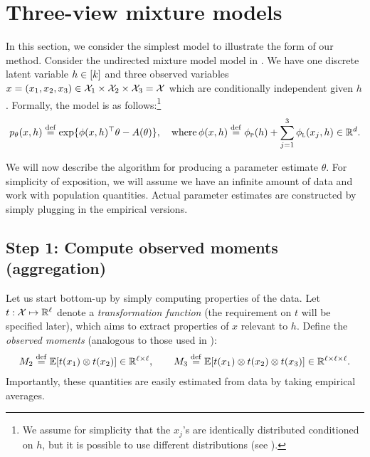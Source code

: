 \section{Three-view mixture models}
\label{sec:threeViewMixtureModel}


In this section, we consider the simplest model to illustrate the form of our
method.  Consider the undirected mixture model model in .
We have one discrete latent variable $h \in [k]$ and
three observed variables
$x = (x_1, x_2, x_3) \in \mathcal{X}_1 \times \mathcal{X}_2 \times \mathcal{X}_3 = \mathcal{X}$
which are conditionally independent given $h$.
Formally, the model is as follows:\footnote{We assume for simplicity that the $x_j$'s are identically distributed conditioned on $h$,
but it is possible to use different distributions (see \citet{anandkumar12moments}).}
\begin{align}
  \label{eqn:mixtureModel}
  p_\theta(x, h) \stackrel{\rm def}{=} \exp \{ \phi(x, h)^\top\theta - A(\theta) \}, \quad\text{where} \, \phi(x, h) \stackrel{\rm def}{=} \phi_\text{\sc p}(h) + \sum_{j=1}^3 \phi_\text{\sc l}(x_j, h) \in \mathbb{R}^d.
\end{align}

We will now describe the algorithm for producing a parameter
estimate $\hat\theta$.  For simplicity of exposition, we will assume we have an infinite
amount of data and work with population quantities.  Actual parameter
estimates are constructed by simply plugging in the empirical versions.

\subsection{Step 1: Compute observed moments (aggregation)}

Let us start bottom-up by simply computing properties of the data.
Let $t : \mathcal{X} \mapsto \mathbb{R}^\ell$ denote a \emph{transformation function}
(the requirement on $t$ will be specified later),
which aims to extract properties of $x$ relevant to $h$.
Define the \emph{observed moments} (analogous to those used in \cite{anandkumar12moments}):
\begin{align}
  M_2 \stackrel{\rm def}{=} \mathbb{E}[t(x_1) \otimes t(x_2)] \in \mathbb{R}^{\ell \times \ell}, \quad\quad
  M_3 \stackrel{\rm def}{=} \mathbb{E}[t(x_1) \otimes t(x_2) \otimes t(x_3)] \in \mathbb{R}^{\ell \times \ell \times \ell}.
\end{align}
Importantly, these quantities are easily estimated from data by taking empirical averages.

